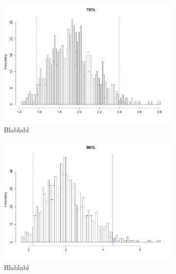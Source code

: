 \documentclass{article}
\renewcommand*{\(}{\left(}
\renewcommand*{\)}{\right)}
\begin{document}
\begin{figure}[H]
    \centering
    \begin{subfigure}[b]{0.3\textwidth}
        \includegraphics[width = \linewidth]{img/BootstrapAEMV-75-30.pdf}
        \caption{Blablabl}
        \label{fig:BAEMV75} %
    \end{subfigure}%
    \begin{subfigure}[b]{0.3\textwidth}
        \includegraphics[width = \linewidth]{img/BootstrapAEMV-90-30.pdf}
        \caption{Blablabl}
        \label{fig:BAEMV90}
    \end{subfigure}%
    \begin{subfigure}[b]{0.3\textwidth}

\end{subfigure}
\end{figure}
\end{document}
